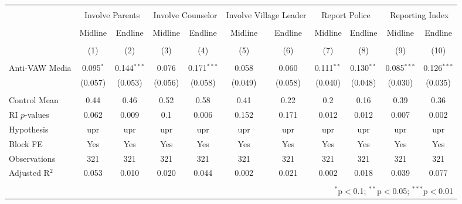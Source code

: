 
\begin{tabular}{@{\extracolsep{5pt}}lcccccccccc} 
\\[-1.8ex]\hline 
\hline \\[-1.8ex] 
 & \multicolumn{2}{c}{Involve Parents} & \multicolumn{2}{c}{Involve Counselor} & \multicolumn{2}{c}{Involve Village Leader} & \multicolumn{2}{c}{Report Police} & \multicolumn{2}{c}{Reporting Index} \\ 
\\[-1.8ex] & Midline & Endline & Midline & Endline & Midline & Endline & Midline & Endline & Midline & Endline \\ 
\\[-1.8ex] & (1) & (2) & (3) & (4) & (5) & (6) & (7) & (8) & (9) & (10)\\ 
\hline \\[-1.8ex] 
 Anti-VAW Media & 0.095$^{*}$ & 0.144$^{***}$ & 0.076 & 0.171$^{***}$ & 0.058 & 0.060 & 0.111$^{**}$ & 0.130$^{**}$ & 0.085$^{***}$ & 0.126$^{***}$ \\ 
  & (0.057) & (0.053) & (0.056) & (0.058) & (0.049) & (0.058) & (0.040) & (0.048) & (0.030) & (0.035) \\ 
 \hline \\[-1.8ex] 
Control Mean & 0.44 & 0.46 & 0.52 & 0.58 & 0.41 & 0.22 & 0.2 & 0.16 & 0.39 & 0.36 \\ 
RI $p$-values & 0.062 & 0.009 & 0.1 & 0.006 & 0.152 & 0.171 & 0.012 & 0.012 & 0.007 & 0.002 \\ 
Hypothesis & upr & upr & upr & upr & upr & upr & upr & upr & upr & upr \\ 
Block FE & Yes & Yes & Yes & Yes & Yes & Yes & Yes & Yes & Yes & Yes \\ 
Observations & 321 & 321 & 321 & 321 & 321 & 321 & 321 & 321 & 321 & 321 \\ 
Adjusted R$^{2}$ & 0.053 & 0.010 & 0.020 & 0.044 & 0.002 & 0.021 & 0.002 & 0.018 & 0.039 & 0.077 \\ 
\hline 
\hline \\[-1.8ex] 
\multicolumn{11}{r}{$^{*}$p$<$0.1; $^{**}$p$<$0.05; $^{***}$p$<$0.01} \\ 
\end{tabular} 
